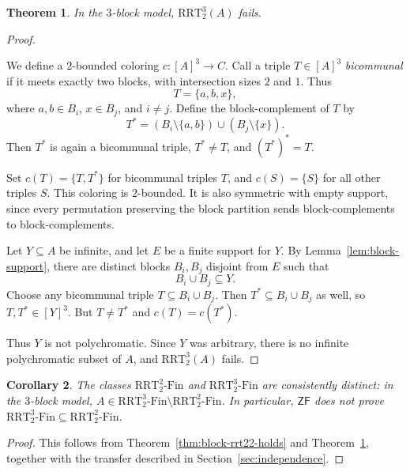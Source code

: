 \documentclass[10pt,a4paper]{amsart}
\newtheorem{theorem}{Theorem}[section]
\newtheorem{corollary}[theorem]{Corollary}
\theoremstyle{definition}
\newcommand{\ZF}{\mathsf{ZF}}
\newcommand{\RRT}{\mathrm{RRT}}
\newcommand{\RRTFin}[2]{\RRT^{#1}_{#2}\text{-}\mathrm{Fin}}
\begin{document}
\begin{theorem}\label{thm:block-rrt32-fails}
In the \(3\)-block model, \(\RRT^3_2(A)\) fails.
\end{theorem}



\begin{proof}
\begin{samepage}
We define a \(2\)-bounded coloring \(c:[A]^3\to C\).  Call a triple \(T\in[A]^3\) \emph{bicommunal} if it meets exactly two blocks, with intersection sizes \(2\) and \(1\).  Thus
\[
    T=\{a,b,x\},
\]
where \(a,b\in B_i\), \(x\in B_j\), and \(i\neq j\).  Define the block-complement of \(T\) by
\[
    T^*=(B_i\setminus\{a,b\})\cup (B_j\setminus\{x\}).
\]
Then \(T^*\) is again a bicommunal triple, \(T^*\neq T\), and \((T^*)^*=T\).
\end{samepage}

Set \(c(T)=\{T,T^*\}\) for bicommunal triples \(T\), and \(c(S)=\{S\}\) for all other triples \(S\).  This coloring is \(2\)-bounded.  It is also symmetric with empty support, since every permutation preserving the block partition sends block-complements to block-complements.

Let \(Y\subseteq A\) be infinite, and let \(E\) be a finite support for \(Y\).  By Lemma~\ref{lem:block-support}, there are distinct blocks \(B_i,B_j\) disjoint from \(E\) such that
\[
    B_i\cup B_j\subseteq Y.
\]
Choose any bicommunal triple \(T\subseteq B_i\cup B_j\).  Then \(T^*\subseteq B_i\cup B_j\) as well, so \(T,T^*\in[Y]^3\).  But \(T\neq T^*\) and \(c(T)=c(T^*)\).

Thus \(Y\) is not polychromatic.  Since \(Y\) was arbitrary, there is no infinite polychromatic subset of \(A\), and \(\RRT^3_2(A)\) fails.
\end{proof}


\begin{corollary}
The classes \(\RRTFin{2}{2}\) and \(\RRTFin{3}{2}\) are consistently distinct: in the \(3\)-block model, \(A\in \RRTFin{3}{2}\setminus \RRTFin{2}{2}\).  In particular, \(\ZF\) does not prove \(\RRTFin{3}{2}\subseteq \RRTFin{2}{2}\).
\end{corollary}

\begin{proof}
This follows from Theorem~\ref{thm:block-rrt22-holds} and Theorem~\ref{thm:block-rrt32-fails}, together with the transfer described in Section~\ref{sec:independence}.
\end{proof}
\end{document}
